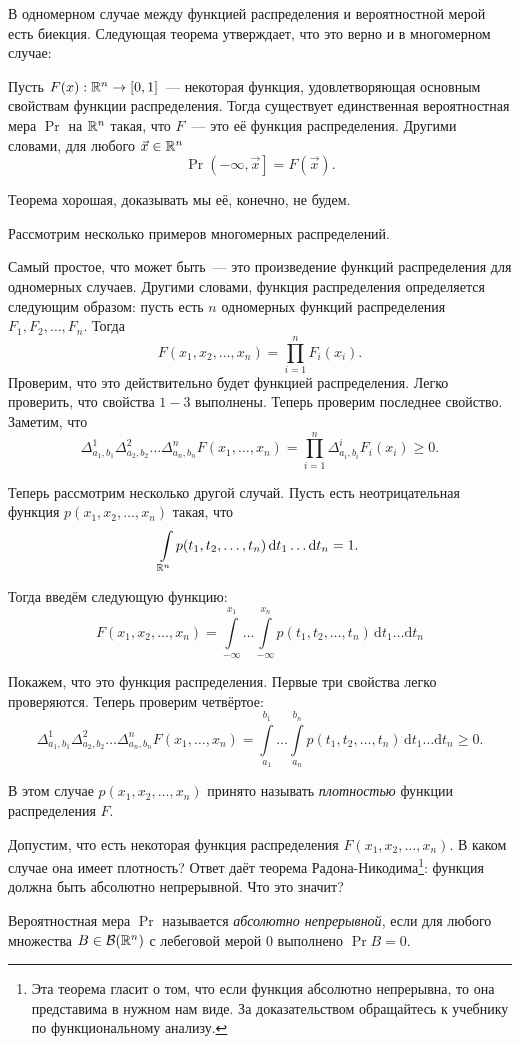 В одномерном случае между функцией распределения и вероятностной мерой есть биекция. Следующая теорема утверждает, что это верно и в многомерном случае:
\begin{theorem}
	Пусть \(F(x): \mathbb{R}^{n} \to [0, 1]\)~--- некоторая функция, удовлетворяющая основным свойствам функции распределения. Тогда существует единственная вероятностная мера \(\Pr\) на \(\mathbb{R}^{n}\) такая, что \(F\)~--- это её функция распределения. Другими словами, для любого \(\vec{x} \in \mathbb{R}^{n}\)
	\[
	\Pr{\left(-\infty, \vec{x}\right]} = F(\vec{x}).
	\]
\end{theorem}
Теорема хорошая, доказывать мы её, конечно, не будем.

Рассмотрим несколько примеров многомерных распределений.

Самый простое, что может быть~--- это произведение функций распределения для одномерных случаев. Другими словами, функция распределения определяется следующим образом: пусть есть \(n\) одномерных функций распределения \(F_1, F_2, \dots, F_n\). Тогда
\[
F(x_1, x_2, \dots, x_n) = \prod\limits_{i = 1}^{n} F_i(x_i).
\]
Проверим, что это действительно будет функцией распределения. Легко проверить, что свойства \(1-3\) выполнены. Теперь проверим последнее свойство. Заметим, что
\[
\Delta_{a_1, b_1}^{1} \Delta_{a_2, b_2}^{2} \dots \Delta_{a_n, b_n}^{n} F(x_1, \dots, x_n) = \prod\limits_{i = 1}^{n} \Delta_{a_i, b_i}^{i}F_i(x_i) \geq 0.
\]

Теперь рассмотрим несколько другой случай. Пусть есть неотрицательная функция \(p(x_1, x_2, \dots, x_n)\) такая, что
\[
\int\limits_{\mathbb{R}^{n}} p(t_1, t_2, \dots, t_n)\,\mathrm{d}t_1\dots\mathrm{d}t_n = 1.
\]

Тогда введём следующую функцию:
\[
F(x_1, x_2, \dots, x_n) = \int\limits_{-\infty}^{x_1} \dots \int\limits_{-\infty}^{x_n} p(t_1, t_2, \dots, t_n)\,\mathrm{d}t_1\dots\mathrm{d}t_n
\]

Покажем, что это функция распределения. Первые три свойства легко проверяются. Теперь проверим четвёртое:
\[
\Delta_{a_1, b_1}^{1} \Delta_{a_2, b_2}^{2} \dots \Delta_{a_n, b_n}^{n} F(x_1, \dots, x_n) = \int\limits_{a_1}^{b_1} \dots \int\limits_{a_n}^{b_n} p(t_1, t_2, \dots, t_n)\,\mathrm{d}t_1\dots\mathrm{d}t_n \geq 0.
\]

В этом случае \(p(x_1, x_2, \dots, x_n)\) принято называть \emph{плотностью} функции распределения \(F\).

Допустим, что есть некоторая функция распределения \(F(x_1, x_2, \dots, x_n)\). В каком случае она имеет плотность? Ответ даёт теорема Радона-Никодима\footnote{Эта теорема гласит о том, что если функция абсолютно непрерывна, то она представима в нужном нам виде. За доказательством обращайтесь к учебнику по функциональному анализу.}: функция должна быть абсолютно непрерывной. Что это значит?
\begin{definition}
	Вероятностная мера \(\Pr\) называется \emph{абсолютно непрерывной}, если для любого множества \(B \in \mathcal{B}(\mathbb{R}^n)\) с лебеговой мерой 0 выполнено \(\Pr{B} = 0\).
\end{definition}

